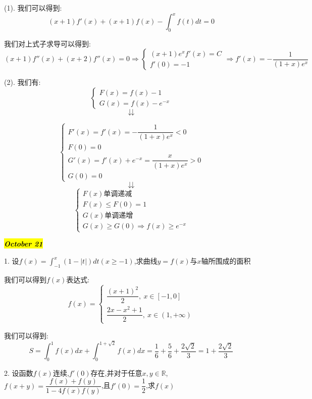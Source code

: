 \begin{solution}

	(1). 我们可以得到:  
	$$(x+1)f'(x)+(x+1)f(x)-\int_{0}^{x}f(t)dt=0$$
	
	我们对上式子求导可以得到:  
	$$(x+1)f''(x)+(x+2)f''(x)=0\Rightarrow \left\lbrace 
	\begin{array}{l}
		(x+1)e^{x}f'(x)=C\\
		f'(0)=-1
	\end{array}
	\right. \Rightarrow f'(x)=-\dfrac{1}{(1+x)e^{x}}$$
	
	(2). 我们有:  $$\left\lbrace 
	\begin{array}{l}
		F(x)=f(x)-1\\
		G(x)=f(x)-e^{-x}
	\end{array}
	\right.$$
	$$\downdownarrows$$ 
	
	$$\left\lbrace 
	\begin{array}{l}
		F'(x)=f'(x)=-\dfrac{1}{(1+x)e^{x}}<0\\
		F(0)=0\\
		G'(x)=f'(x)+e^{-x}=\dfrac{x}{(1+x)e^{x}}>0\\
		G(0)=0
	\end{array}
	\right.$$ 
	$$\downdownarrows$$ 
	$$\left\lbrace 
	\begin{array}{l}
		F(x)\text{单调递减}\\
		F(x)\leq F(0)=1\\
		G(x)\text{单调递增}\\
		G(x)\geq G(0)\Rightarrow f(x)\geq e^{-x}
	\end{array}
	\right. $$
\end{solution}

\hl{\textbf{\textit{October 21}}}

1. 设$f(x)=\int_{-1}^{x}(1-|t|)dt(x\geq -1)$,求曲线$y=f(x)$与$x$轴所围成的面积
\begin{solution}

	我们可以得到$f(x)$表达式:  
	$$f(x)=\left\lbrace 
	\begin{array}{l}
		\dfrac{(x+1)^2}{2},\ x\in[-1,0]\\
		\dfrac{2x-x^2+1}{2},\ x\in(1,+\infty)
	\end{array}
	\right. $$
	
	我们可以得到:  
	$$S=\int_{0}^{1}f(x)dx+\int_{0}^{1+\sqrt{2}}f(x)dx=\dfrac{1}{6}+\dfrac{5}{6}+\dfrac{2\sqrt{2}}{3}=1+\dfrac{2\sqrt{2}}{3}$$
\end{solution}

2. 设函数$f(x)$连续,$f'(0)$存在,并对于任意$x,y\in\mathbb{R}$,$f(x+y)=\dfrac{f(x)+f(y)}{1-4f(x)f(y)}$,且$f'(0)=\dfrac{1}{2}$,求$f(x)$

